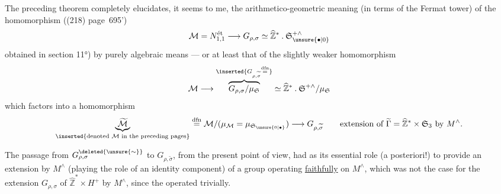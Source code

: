 


 The preceding theorem completely elucidates, it seems to me, the arithmetico-geometric meaning (in terms of the Fermat tower) of the homomorphism ((218) page~695')
\[
\mathcal M=N_{1,1}^{\text{ét}}\longrightarrow G_{\rho,\sigma}\simeq\widehat{\mathbb Z}^{*}\mathbin{.}\mathfrak S_{\unsure{\bullet|0}}^{+\wedge}
\]
obtained in section 11°) by purely algebraic means --- or at least that of the slightly weaker homomorphism
\[
\mathcal M\longrightarrow\overbrace{G_{\rho,\sigma}/\mu_{\mathfrak S}}^{\inserted{G_{\rho,\widetilde{\sigma}}\overset{\mathrm{dfn}}{=}}}\simeq\widehat{\mathbb Z}^{*}\mathbin{.}\mathfrak S^{+\wedge}/\mu_{\mathfrak S}
\]
which factors  into a homomorphism
\[
\underbrace{\widetilde{\mathcal M}}_{\inserted{\text{denoted }\mathcal M\text{ in the preceding pages}}}\overset{\mathrm{dfn}}{=}\mathcal M/(\mu_{\mathcal M}=\mu_{\mathfrak S_{\unsure{0|\bullet}}})\longrightarrow G_{\rho,\widetilde{\sigma}}
\qquad\text{extension of }\widetilde\Gamma=\widehat{\mathbb Z}^{*}\times\mathfrak S_3\text{ by }M^\wedge.
\]

The passage from $G_{\rho,\sigma}^{\deleted{\unsure{\sim}}}$ to $G_{\rho,\widetilde{\sigma}}$, from the present point of view, had as its essential role (a posteriori!) to provide an extension by $M^\wedge$ (playing the role of an identity component) of a group operating \uline{faithfully} on $M^\wedge$, which was not the case for the extension $G_{\rho,\sigma}$ of $\widehat{\mathbb Z}^{*}\times H^+$ by $M^\wedge$, since the   operated trivially.


